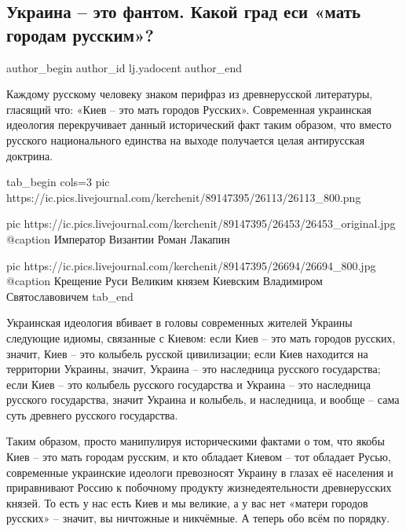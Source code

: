  
 
 
 
 
\subsection{Украина – это фантом. Какой град еси «мать городам русским»?}
\label{sec:01_10_2021.lj.yadocent.1.ukraina_fantom_grad_mat_gorodam_russkim}


\ifcmt
  author_begin
    author_id lj.yadocent
  author_end
\fi

Каждому русскому человеку знаком перифраз из древнерусской литературы, гласящий
что: «Киев – это мать городов Русских». Современная украинская идеология
перекручивает данный исторический факт таким образом, что вместо русского
национального единства на выходе получается целая антирусская доктрина.

\ifcmt
  tab_begin cols=3
     pic https://ic.pics.livejournal.com/kerchenit/89147395/26113/26113_800.png

     pic https://ic.pics.livejournal.com/kerchenit/89147395/26453/26453_original.jpg
     @caption Император Византии Роман Лакапин

     pic https://ic.pics.livejournal.com/kerchenit/89147395/26694/26694_800.jpg
     @caption Крещение Руси Великим князем Киевским Владимиром Святославовичем
  tab_end
\fi

Украинская идеология вбивает в головы современных жителей Украины следующие
идиомы, связанные с Киевом: если Киев – это мать городов русских, значит, Киев
– это колыбель русской цивилизации; если Киев находится на территории Украины,
значит, Украина – это наследница русского государства; если Киев – это колыбель
русского государства и Украина – это наследница русского государства, значит
Украина и колыбель, и наследница, и вообще – сама суть древнего русского
государства.

Таким образом, просто манипулируя историческими фактами о том, что якобы Киев –
это мать городам русским, и кто обладает Киевом – тот обладает Русью,
современные украинские идеологи превозносят Украину в глазах её населения и
приравнивают Россию к побочному продукту жизнедеятельности древнерусских
князей. То есть у нас есть Киев и мы великие, а у вас нет «матери городов
русских» – значит, вы ничтожные и никчёмные. А теперь обо всём по порядку.

